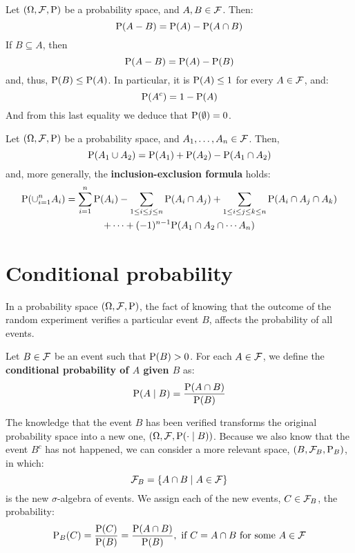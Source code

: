 \begin{prop}
	Let $(\O, \F, \P)$ be a probability space, and $A, B \in \F$. Then:
	\[
		\P(A - B) = \P(A) - \P(A \cap B)
	\]
	If $B \subseteq A$, then
	\[
		\P(A - B) = \P(A) - \P(B)
	\]
	and, thus, $\P(B) \leq \P(A)$. In particular, it is $\P(A) \leq 1$ for every $A \in \F$, and:
	\[
		\P(A^c) = 1 - \P(A)
	\]
	And from this last equality we deduce that $\P(\emptyset) = 0$.
\end{prop}

\begin{prop}
	Let $(\O, \F, \P)$ be a probability space, and $A_1, \ldots, A_n \in \F$. Then,
	\[
		\P(A_1 \cup A_2) = \P(A_1) + \P(A_2) - \P(A_1 \cap A_2)
	\]
	and, more generally, the \textbf{inclusion-exclusion formula} holds:
	\[
		\begin{gathered}
		\P(\cup_{i = 1}^n A_i) = \sum_{i = 1}^n\P(A_i) - \sum_{1 \leq i \leq j \leq n}\P(A_i \cap A_j) + \sum_{1 \leq i \leq j \leq k \leq n} \P(A_i \cap A_j \cap A_k) \\ + \cdots + (-1)^{n - 1} \P(A_1 \cap A_2 \cap \cdots A_n)
		\end{gathered}
	\]
\end{prop}

\section{Conditional probability}

In a probability space $(\O, \F, \P)$, the fact of knowing that the outcome of the random experiment verifies a particular event $B$, affects the probability of all events.

\begin{definition}
	Let $B \in \F$ be an event such that $\P(B) > 0$. For each $A \in \F$, we define the \textbf{conditional probability of $A$ given $B$} as:
	\[
		\P(A \mid B) = \frac{\P(A \cap B)}{\P(B)}
	\]
\end{definition}

The knowledge that the event $B$ has been verified transforms the original probability space into a new one, $(\O, \F, \P(\cdot \mid B))$. Because we also know that the event $B^c$ has not happened, we can consider a more relevant space, $(B, \F_B, \P_B)$, in which:
\[
	\F_B = \{ A \cap B \mid A \in \F \}
\]
is the new $\sigma$-algebra of events. We assign each of the new events, $C \in \F_B$, the probability:
\[
	\P_B(C) = \frac{\P(C)}{\P(B)} = \frac{\P(A \cap B)}{\P(B)}, \text{ if } C = A \cap B \text{ for some } A \in \F
\]

